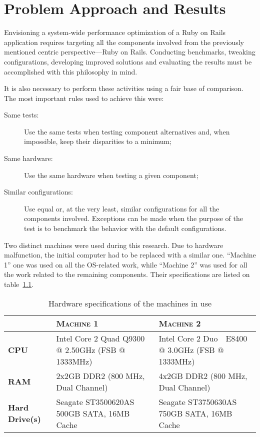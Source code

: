 \chapter{Problem Approach and Results} %
\label{cha:problem_approach_and_results}

Envisioning a system-wide performance optimization of a Ruby on Rails application requires targeting all the components involved from the previously mentioned centric perspective---Ruby on Rails. Conducting benchmarks, tweaking configurations, developing improved solutions and evaluating the results must be accomplished with this philosophy in mind. 

It is also necessary to perform these activities using a fair base of comparison. The most important rules used to achieve this were:
\begin{description}
  \item[Same tests:] Use the same tests when testing component alternatives and, when impossible, keep their disparities to a minimum;
  \item[Same hardware:] Use the same hardware when testing a given component;
  \item[Similar configurations:] Use equal or, at the very least, similar configurations for all the components involved. Exceptions can be made when the purpose of the test is to benchmark the behavior with the default configurations.
\end{description}

Two distinct machines were used during this research. Due to hardware malfunction, the initial computer had to be replaced with a similar one. ``Machine 1'' one was used on all the OS-related work, while ``Machine 2'' was used for all the work related to the remaining components. Their specifications are listed on table~\ref{tab:machines_hardware_specification}.
\begin{table}[ht]
  \centering
  
  \begin{tabular}{p{}|p{}|p{}}
  & \textsc{Machine 1}
  & \textsc{Machine 2} \\
  \hline
    \textbf{CPU}
  & Intel Core 2 Quad Q9300 @ 2.50GHz (FSB @ 1333MHz)
  & Intel Core 2 Duo ~\,E8400 @ 3.0GHz (FSB @ 1333MHz) \\

  \hline
    \textbf{RAM}
  & 2x2GB DDR2 (800 MHz, Dual Channel)
  & 4x2GB DDR2 (800 MHz, Dual Channel) \\

  \hline
    \textbf{Hard Drive(s)}
  & Seagate ST3500620AS 500GB SATA, 16MB Cache
  & Seagate ST3750630AS 750GB SATA, 16MB Cache \\
  \end{tabular}
  \caption{Hardware specifications of the machines in use}
  \label{tab:machines_hardware_specification}
\end{table}

